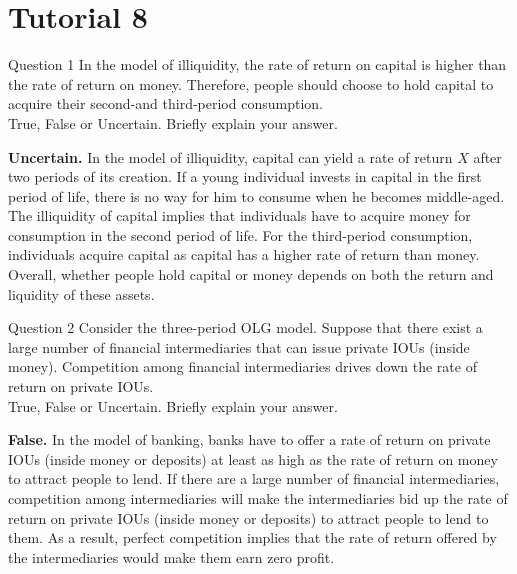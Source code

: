 \documentclass[a4paper]{article}
\newif\IfInSansMode
\numberwithin{equation}{section}
\numberwithin{figure}{section}
\begin{document}
\section{Tutorial 8}
	\begin{questionbox}{Question 1}
		In the model of illiquidity, the rate of return on capital is higher than the rate of return on money. Therefore, people should choose to hold capital to acquire their second-and third-period consumption.\\
		True, False or Uncertain. Briefly explain your answer.
		\begin{explanationbox}
			\textbf{Uncertain.} In the model of illiquidity, capital can yield a rate of return \( X \) after two periods of its creation. If a young individual invests in capital in the first period of life, there is no way for him to consume when he becomes middle-aged. The illiquidity of capital implies that individuals have to acquire money for consumption in the second period of life. For the third-period consumption, individuals acquire capital as capital has a higher rate of return than money. Overall, whether people hold capital or money depends on both the return and liquidity of these assets.
		\end{explanationbox}
	\end{questionbox}
	\begin{questionbox}{Question 2}
		Consider the three-period OLG model. Suppose that there exist a large number of financial intermediaries that can issue private IOUs (inside money). Competition among financial intermediaries drives down the rate of return on private IOUs.\\
		True, False or Uncertain. Briefly explain your answer.
		\begin{explanationbox}
			\textbf{False.} In the model of banking, banks have to offer a rate of return on private IOUs (inside money or deposits) at least as high as the rate of return on money to attract people to lend. If there are a large number of financial intermediaries, competition among intermediaries will make the intermediaries bid up the rate of return on private IOUs (inside money or deposits) to attract people to lend to them. As a result, perfect competition implies that the rate of return offered by the intermediaries would make them earn zero profit.
		\end{explanationbox}
	\end{questionbox}
\end{document}
